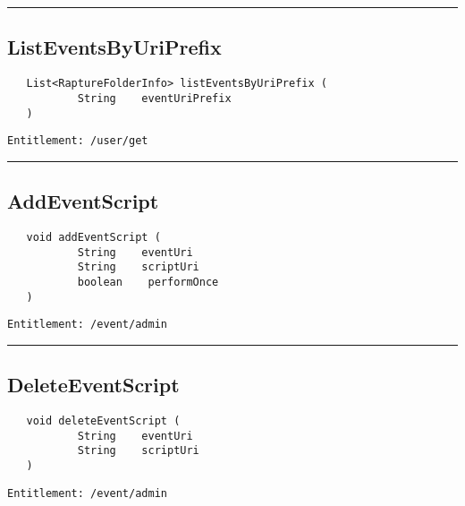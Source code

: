 \rule{12cm}{2pt}
\subsection{ListEventsByUriPrefix}
\label{Api:ListEventsByUriPrefix}
\begin{verbatim}
   List<RaptureFolderInfo> listEventsByUriPrefix (
           String    eventUriPrefix
   )
\end{verbatim}
\begin{Verbatim}[fontsize=\small, formatcom=\color{Maroon}]
  Entitlement: /user/get
\end{Verbatim}



\rule{12cm}{2pt}
\subsection{AddEventScript}
\label{Api:AddEventScript}
\begin{verbatim}
   void addEventScript (
           String    eventUri
           String    scriptUri
           boolean    performOnce
   )
\end{verbatim}
\begin{Verbatim}[fontsize=\small, formatcom=\color{Maroon}]
  Entitlement: /event/admin
\end{Verbatim}



\rule{12cm}{2pt}
\subsection{DeleteEventScript}
\label{Api:DeleteEventScript}
\begin{verbatim}
   void deleteEventScript (
           String    eventUri
           String    scriptUri
   )
\end{verbatim}
\begin{Verbatim}[fontsize=\small, formatcom=\color{Maroon}]
  Entitlement: /event/admin
\end{Verbatim}



